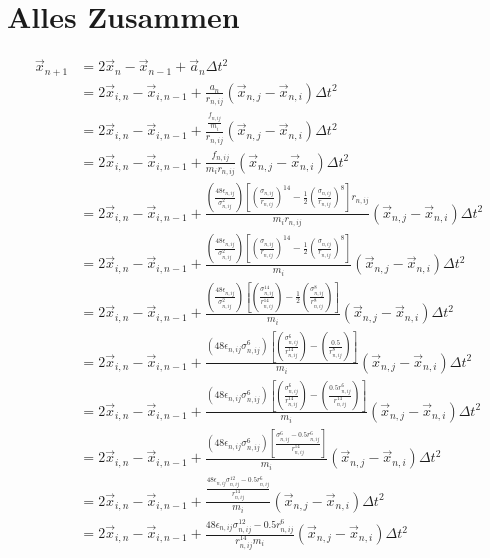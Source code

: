\documentclass{article}
\begin{document}
\section*{Alles Zusammen}
\begin{align}
	\vec{x}_{n+1}&=2\vec{x}_n-\vec{x}_{n-1}+\vec{a}_n\Delta t^2\\
	&=2\vec{x}_{i,n}-\vec{x}_{i,n-1}+\frac{a_n}{r_{n,ij}}\left(\vec{x}_{n,j}-\vec{x}_{n,i}\right)\Delta t^2\\
	&=2\vec{x}_{i,n}-\vec{x}_{i,n-1}+\frac{\frac{f_{n,ij}}{m_i}}{r_{n,ij}}\left(\vec{x}_{n,j}-\vec{x}_{n,i}\right)\Delta t^2\\
	&=2\vec{x}_{i,n}-\vec{x}_{i,n-1}+\frac{f_{n,ij}}{m_ir_{n,ij}}\left(\vec{x}_{n,j}-\vec{x}_{n,i}\right)\Delta t^2\\
	&=2\vec{x}_{i,n}-\vec{x}_{i,n-1}+\frac{\left(\frac{48\epsilon_{n,ij}}{\sigma_{n,ij}^2}\right)\left[\left(\frac{\sigma_{n,ij}}{r_{n,ij}}\right)^{14}-\frac{1}{2}\left(\frac{\sigma_{n,ij}}{r_{n,ij}}\right)^8\right]r_{n,ij}}{m_ir_{n,ij}}\left(\vec{x}_{n,j}-\vec{x}_{n,i}\right)\Delta t^2\\
	&=2\vec{x}_{i,n}-\vec{x}_{i,n-1}+\frac{\left(\frac{48\epsilon_{n,ij}}{\sigma_{n,ij}^2}\right)\left[\left(\frac{\sigma_{n,ij}}{r_{n,ij}}\right)^{14}-\frac{1}{2}\left(\frac{\sigma_{n,ij}}{r_{n,ij}}\right)^8\right]}{m_i}\left(\vec{x}_{n,j}-\vec{x}_{n,i}\right)\Delta t^2\\
	&=2\vec{x}_{i,n}-\vec{x}_{i,n-1}+\frac{\left(\frac{48\epsilon_{n,ij}}{\sigma_{n,ij}^2}\right)\left[\left(\frac{\sigma_{n,ij}^{14}}{r_{n,ij}^{14}}\right)-\frac{1}{2}\left(\frac{\sigma_{n,ij}^8}{r_{n,ij}^8}\right)\right]}{m_i}\left(\vec{x}_{n,j}-\vec{x}_{n,i}\right)\Delta t^2\\
	&=2\vec{x}_{i,n}-\vec{x}_{i,n-1}+\frac{\left(48\epsilon_{n,ij}\sigma_{n,ij}^{6}\right)\left[\left(\frac{\sigma_{n,ij}^{6}}{r_{n,ij}^{14}}\right)-\left(\frac{0.5}{r_{n,ij}^8}\right)\right]}{m_i}\left(\vec{x}_{n,j}-\vec{x}_{n,i}\right)\Delta t^2\\
	&=2\vec{x}_{i,n}-\vec{x}_{i,n-1}+\frac{\left(48\epsilon_{n,ij}\sigma_{n,ij}^{6}\right)\left[\left(\frac{\sigma_{n,ij}^{6}}{r_{n,ij}^{14}}\right)-\left(\frac{0.5r_{n,ij}^6}{r_{n,ij}^{14}}\right)\right]}{m_i}\left(\vec{x}_{n,j}-\vec{x}_{n,i}\right)\Delta t^2\\
	&=2\vec{x}_{i,n}-\vec{x}_{i,n-1}+\frac{\left(48\epsilon_{n,ij}\sigma_{n,ij}^{6}\right)\left[\frac{\sigma_{n,ij}^{6}-0.5r_{n,ij}^6}{r_{n,ij}^{14}}\right]}{m_i}\left(\vec{x}_{n,j}-\vec{x}_{n,i}\right)\Delta t^2\\
	&=2\vec{x}_{i,n}-\vec{x}_{i,n-1}+\frac{\frac{48\epsilon_{n,ij}\sigma_{n,ij}^{12}-0.5r_{n,ij}^6}{r_{n,ij}^{14}}}{m_i}\left(\vec{x}_{n,j}-\vec{x}_{n,i}\right)\Delta t^2\\
	&=2\vec{x}_{i,n}-\vec{x}_{i,n-1}+\frac{48\epsilon_{n,ij}\sigma_{n,ij}^{12}-0.5r_{n,ij}^6}{r_{n,ij}^{14}m_i}\left(\vec{x}_{n,j}-\vec{x}_{n,i}\right)\Delta t^2\\
\end{align}
\end{document}
